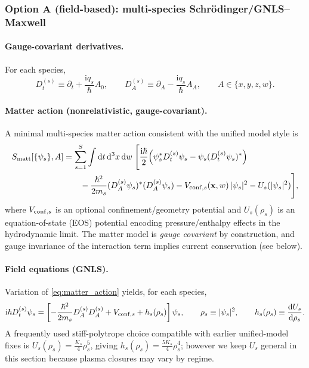 \documentclass[11pt]{article}
\newcommand{\ii}{\mathrm{i}}
\newcommand{\x}{\mathbf{x}}     %
\begin{document}
\subsubsection*{Option A (field-based): multi-species Schr\"odinger/GNLS--Maxwell}

\paragraph{Gauge-covariant derivatives.}
For each species,
\begin{equation}
D_t^{(s)} \equiv \partial_t + \frac{\ii q_s}{\hbar}A_0,
\qquad
D_A^{(s)} \equiv \partial_A - \frac{\ii q_s}{\hbar}A_A,
\qquad A\in\{x,y,z,w\}.
\label{eq:cov_derivatives_species}
\end{equation}

\paragraph{Matter action (nonrelativistic, gauge-covariant).}
A minimal multi-species matter action consistent with the unified model style is
\begin{equation}
\begin{split}
S_{\rm matt}[\{\psi_s\},A]
&=
\sum_{s=1}^S
\int \dd t\,\dd^3x\,\dd w\;
\Biggl[
\frac{\ii\hbar}{2}\Bigl(\psi_s^\ast D_t^{(s)}\psi_s - \psi_s (D_t^{(s)}\psi_s)^\ast\Bigr)
\\
&\qquad
-\frac{\hbar^2}{2m_s}(D_A^{(s)}\psi_s)^\ast(D_A^{(s)}\psi_s)
- V_{{\rm conf},s}(\x,w)\,|\psi_s|^2
- U_s(|\psi_s|^2)
\Biggr],
\end{split}
\label{eq:matter_action}
\end{equation}
where \(V_{{\rm conf},s}\) is an optional confinement/geometry potential and
\(U_s(\rho_s)\) is an equation-of-state (EOS) potential encoding pressure/enthalpy
effects in the hydrodynamic limit. The matter model is \emph{gauge covariant} by
construction, and gauge invariance of the interaction term implies current
conservation (see below).

\paragraph{Field equations (GNLS).}
Variation of \eqref{eq:matter_action} yields, for each species,
\begin{equation}
\ii\hbar D_t^{(s)}\psi_s
=
\left[
-\frac{\hbar^2}{2m_s}D_A^{(s)}D_A^{(s)}
+V_{{\rm conf},s}
+h_s(\rho_s)
\right]\psi_s,
\qquad
\rho_s\equiv|\psi_s|^2,
\qquad
h_s(\rho_s)\equiv \frac{\dd U_s}{\dd \rho_s}.
\label{eq:gnls_species}
\end{equation}
A frequently used stiff-polytrope choice compatible with earlier unified-model
fixes is \(U_s(\rho_s)=\frac{K_s}{4}\rho_s^5\), giving \(h_s(\rho_s)=\frac{5K_s}{4}\rho_s^4\);
however we keep \(U_s\) general in this section because plasma closures may vary by
regime.
\end{document}
